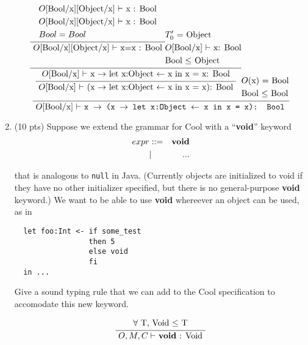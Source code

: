 \documentclass[10pt]{article}
\newcommand{\infertext}[2]{\infer{{\textrm{#2}}}{\begin{aligned}#1\end{aligned}}}
\begin{document}
\begin{enumerate}
\begin{equation}
\infertext{
	\infertext{
		\infertext{
			\infertext{
				& \textrm{$O$[Bool/x][Object/x] $\vdash$ x : Bool} \\
				& \textrm{$O$[Bool/x][Object/x] $\vdash$ x : Bool} \\
				& Bool = Bool
			} {
				\textrm{$O$[Bool/x][Object/x] $\vdash$ x=x : Bool}
			}
			\begin{aligned}
				& \textrm{$T_0'$ = Object} \\
				& \textrm{$O$[Bool/x] $\vdash$ x: Bool} \\
				& \textrm{Bool $\leq$ Object} \\
			\end{aligned}
		} {
			$O$[Bool/x] $\vdash$ x $\rightarrow$ let x:Object $\leftarrow$ x in x = x: Bool
		}
	} {
		$O$[Bool/x] $\vdash$ (x $\rightarrow$ let x:Object $\leftarrow$ x in x = x): Bool
	} 
	\begin{aligned}
		& \textrm{$O$(x) = Bool } \\
		& \textrm{Bool $\leq$ Bool} \\
	\end{aligned}
} {
	$O$[Bool/x] $\vdash$ \tt{x $\rightarrow$ (x $\rightarrow$ let x:Object $\leftarrow$ x in x = x): Bool}
}
\end{equation}

\medskip
\item (10 pts) Suppose we extend the grammar for Cool with a ``{\bf void}'' keyword
\begin{eqnarray*}
  expr & ::= & {\bf void} \\
	   & |   & ...
\end{eqnarray*}

  that is analogous to {\tt null} in Java. (Currently objects are
  initialized to void if they have no other initializer specified, but
  there is no general-purpose {\bf void} keyword.)  We want to be able
  to use {\bf void} whereever an object can be used, as in
\begin{verbatim}
  let foo:Int <- if some_test
				 then 5
				 else void
				 fi
  in ...
\end{verbatim}

  Give a sound typing rule that we can add to the Cool specification
  to accomodate this new keyword.

\begin{equation}\infertext{
	\textrm{$\forall$ T, Void $\leq$ T}
} {
	$O, M, C \vdash$ \textbf{void} : Void
}\end{equation}


\end{enumerate}
\end{document}
